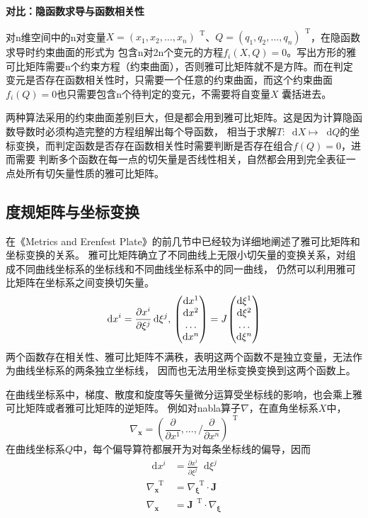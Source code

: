 \documentclass[UTF8]{ctexart}
\newcommand{\dif}{\mathop{}\!\mathrm{d}}
\newcommand{\tr}{\mathop{}\!\mathrm{T}}
\begin{document}
\textbf{对比：隐函数求导与函数相关性}

对n维空间中的n对变量$X=(x_{1},x_{2},\dots,x_{n})^{\tr}$、$Q=(q_{1},q_{2},\dots,q_{n})^{\tr}$，在隐函数求导时约束曲面的形式为
包含n对2n个变元的方程$f_{i}(X,Q)=0$。写出方形的雅可比矩阵需要n个约束方程（约束曲面），否则雅可比矩阵就不是方阵。而在判定
变元是否存在函数相关性时，只需要一个任意的约束曲面，而这个约束曲面$f_{i}(Q)=0$也只需要包含n个待判定的变元，不需要将自变量$X$
囊括进去。

两种算法采用的约束曲面差别巨大，但是都会用到雅可比矩阵。这是因为计算隐函数导数时必须构造完整的方程组解出每个导函数，
相当于求解$T: \dif X\mapsto\dif Q$的坐标变换，而判定函数是否存在函数相关性时需要判断是否存在组合$f(Q)=0$，进而需要
判断多个函数在每一点的切矢量是否线性相关，自然都会用到完全表征一点处所有切矢量性质的雅可比矩阵。
\subsection{度规矩阵与坐标变换}
在《Metrics and Erenfest Plate》的前几节中已经较为详细地阐述了雅可比矩阵和坐标变换的关系。
雅可比矩阵确立了不同曲线上无限小切矢量的变换关系，对组成不同曲线坐标系的坐标线和不同曲线坐标系中的同一曲线，
仍然可以利用雅可比矩阵在坐标系之间变换切矢量。
\begin{equation}
  \dif x^{i}=\frac{\partial x^i}{\partial \xi^{j}}\dif \xi^{j},\\
  \begin{pmatrix}
    \dif x^{1} \\ \dif x^{2} \\ \dots \\ \dif x^{n}
  \end{pmatrix}
  =
  \textit{J}
  \begin{pmatrix}
    \dif \xi^{1} \\ \dif \xi^{2} \\ \dots \\ \dif \xi^{n}
  \end{pmatrix}
\end{equation}
两个函数存在相关性、雅可比矩阵不满秩，表明这两个函数不是独立变量，无法作为曲线坐标系的两条独立坐标线，
因而也无法用坐标变换变换到这两个函数上。

在曲线坐标系中，梯度、散度和旋度等矢量微分运算受坐标线的影响，也会乘上雅可比矩阵或者雅可比矩阵的逆矩阵。
例如对nabla算子$\nabla$，在直角坐标系$X$中，
\begin{equation}
  \nabla_{\textbf{x}}=(\frac{\partial}{\partial x^{1}},\dots,/\frac{\partial}{\partial x^{n}})^{\tr}
\end{equation}
在曲线坐标系$Q$中，每个偏导算符都展开为对每条坐标线的偏导，因而
\begin{align} \label{*}
  \dif x^{i}&=\frac{\partial x^i}{\partial \xi^{j}}\dif \xi^{j} \\
  \nabla_{\textbf{x}}^{\tr}&=\nabla_{\boldsymbol{\xi}}^{\tr}\cdot\textbf{J} \\
  \nabla_{\textbf{x}}&=\textbf{J}^{\tr}\cdot\nabla_{\boldsymbol{\xi}}
\end{align}
\end{document}

